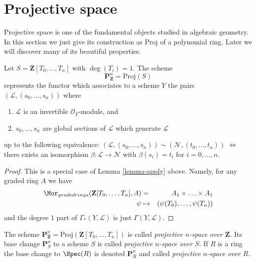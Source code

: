 \section{Projective space}
\label{section-projective-space}

\noindent
Projective space is one of the fundamental objects studied in
algebraic geometry. In this section we just give its construction
as $\text{Proj}$ of a polynomial ring. Later we will discover many
of its beautiful properties.

\begin{lemma}
\label{lemma-projective-space}
Let $S = \mathbf{Z}[T_0, \ldots, T_n]$ with $\deg(T_i) = 1$.
The scheme
$$
\mathbf{P}^n_{\mathbf{Z}} = \text{Proj}(S)
$$
represents the functor which associates to a scheme $Y$ the pairs
$(\mathcal{L}, (s_0, \ldots, s_n))$ where
\begin{enumerate}
\item $\mathcal{L}$ is an invertible $\mathcal{O}_Y$-module, and
\item $s_0, \ldots, s_n$ are global sections of $\mathcal{L}$
which generate $\mathcal{L}$
\end{enumerate}
up to the following equivalence:
$(\mathcal{L}, (s_0, \ldots, s_n)) \sim
(\mathcal{N}, (t_0, \ldots, t_n))$ $\Leftrightarrow$ there exists
an isomorphism $\beta : \mathcal{L} \to \mathcal{N}$
with $\beta(s_i) = t_i$ for $i = 0, \ldots, n$.
\end{lemma}

\begin{proof}
This is a special case of Lemma \ref{lemma-apply} above.
Namely, for any graded ring $A$ we have
\begin{eqnarray*}
\Mor_{graded rings}(\mathbf{Z}[T_0, \ldots, T_n], A)
& = &
A_1 \times \ldots \times A_1 \\
\psi & \mapsto & (\psi(T_0), \ldots, \psi(T_n))
\end{eqnarray*}
and the degree $1$ part of $\Gamma_*(Y, \mathcal{L})$ is
just $\Gamma(Y, \mathcal{L})$.
\end{proof}

\begin{definition}
\label{definition-projective-space}
The scheme
$\mathbf{P}^n_{\mathbf{Z}} = \text{Proj}(\mathbf{Z}[T_0, \ldots, T_n])$
is called {\it projective $n$-space over $\mathbf{Z}$}.
Its base change $\mathbf{P}^n_S$ to a scheme $S$ is called
{\it projective $n$-space over $S$}. If $R$ is a ring the base change
to $\Spec(R)$ is denoted $\mathbf{P}^n_R$ and called
{\it projective $n$-space over $R$}.
\end{definition}

